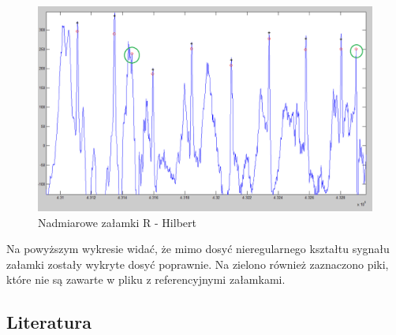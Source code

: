 \begin{figure}[H]
\centering
\includegraphics[scale=0.4]{R_PEAKS/img/105_hilbert_nadmiar}
\caption{Nadmiarowe załamki R - Hilbert}
\label{fig:105HN}
\end{figure}
Na powyższym wykresie widać, że mimo dosyć nieregularnego kształtu sygnału załamki zostały wykryte dosyć poprawnie. Na zielono również zaznaczono piki, które nie są zawarte w pliku z referencyjnymi załamkami.
\subsection{Literatura}